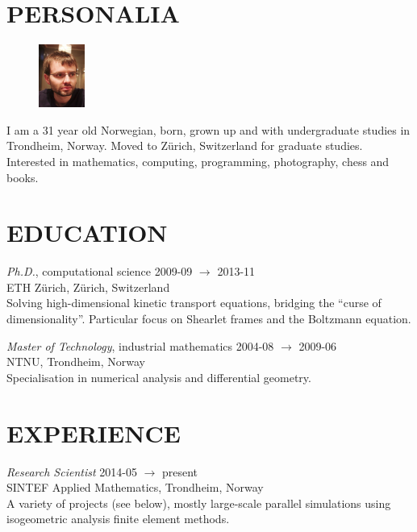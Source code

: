 \documentclass[line,margin]{res}
\newcommand{\zh}{Z\"{u}rich}
\begin{document}
\address{Høgreina 394, NO-7079 Flatåsen}
\address{+47 41 44 98 89, evfonn@gmail.com}


\begin{resume}

\section{PERSONALIA}

\begin{figure}
  \vspace{-0.6cm}
  \includegraphics[width=1.5cm]{photo.png}
\end{figure}

I am a 31 year old Norwegian, born, grown up and with undergraduate studies in
Trondheim, Norway. Moved to Zürich, Switzerland for graduate studies. Interested
in mathematics, computing, programming, photography, chess and books.

\section{EDUCATION}

{\em Ph.D.}, computational science \hfill 2009-09 $\to$ 2013-11 \\
ETH \zh, \zh, Switzerland \\
Solving high-dimensional kinetic transport equations, bridging the ``curse of
dimensionality''. Particular focus on Shearlet frames and the Boltzmann equation.

{\em Master of Technology}, industrial mathematics \hfill 2004-08 $\to$ 2009-06 \\
NTNU, Trondheim, Norway \\
Specialisation in numerical analysis and differential geometry.

\section{EXPERIENCE}

{\em Research Scientist} \hfill 2014-05 $\to$ present \\
SINTEF Applied Mathematics, Trondheim, Norway \\
A variety of projects (see below), mostly large-scale parallel simulations using
isogeometric analysis finite element methods.


\end{resume}
\end{document}

